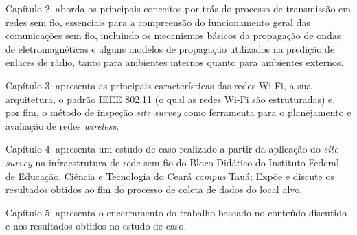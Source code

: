 \begin{alineascomponto}
	\item Capítulo 2: aborda os principais conceitos por trás do processo de transmissão em redes sem fio, essenciais para a compreensão do funcionamento geral das comunicações sem fio, incluindo os mecanismos básicos da propagação de ondas de eletromagnéticas e alguns modelos de propagação utilizados na predição de enlaces de rádio, tanto para ambientes internos quanto para ambientes externos.
	
	\item Capítulo 3: apresenta as principais características das redes Wi-Fi, a sua arquitetura, o padrão IEEE 802.11 (o qual as redes Wi-Fi são estruturadas) e, por fim, o método de inspeção \textit{site survey} como ferramenta para o planejamento e avaliação de redes \textit{wireless}.
	
	\item Capítulo 4: apresenta um estudo de caso realizado a partir da aplicação do \textit{site survey} na infraestrutura de rede sem fio do Bloco Didático do Instituto Federal de Educação, Ciência e Tecnologia do Ceará \textit{campus} Tauá; Expõe e discute os resultados obtidos ao fim do processo de coleta de dados do local alvo.
	
	\item Capítulo 5: apresenta o encerramento do trabalho baseado no conteúdo discutido e nos resultados obtidos no estudo de caso.
\end{alineascomponto}